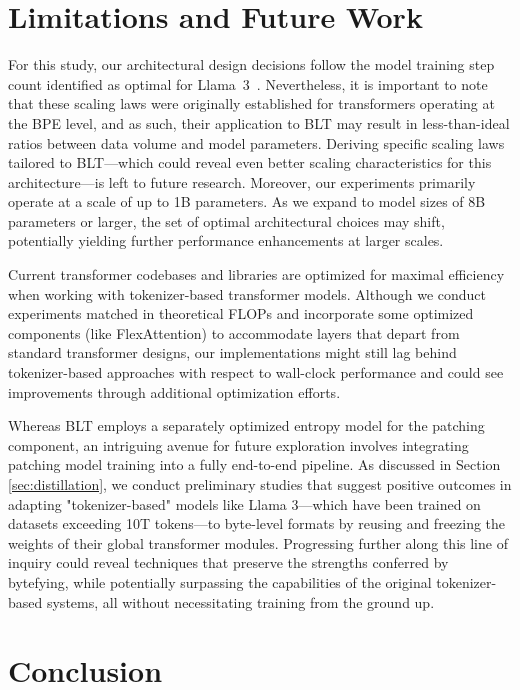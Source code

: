 \section{Limitations and Future Work}

For this study, our architectural design decisions follow the model training step count identified as optimal for Llama~3~\citep{dubey2024llama}. Nevertheless, it is important to note that these scaling laws were originally established for transformers operating at the BPE level, and as such, their application to {\textsc BLT} may result in less-than-ideal ratios between data volume and model parameters. Deriving specific scaling laws tailored to {\textsc BLT}—which could reveal even better scaling characteristics for this architecture—is left to future research. Moreover, our experiments primarily operate at a scale of up to 1B parameters. As we expand to model sizes of 8B parameters or larger, the set of optimal architectural choices may shift, potentially yielding further performance enhancements at larger scales.

Current transformer codebases and libraries are optimized for maximal efficiency when working with tokenizer-based transformer models. Although we conduct experiments matched in theoretical FLOPs and incorporate some optimized components (like FlexAttention) to accommodate layers that depart from standard transformer designs, our implementations might still lag behind tokenizer-based approaches with respect to wall-clock performance and could see improvements through additional optimization efforts.

Whereas {\textsc BLT} employs a separately optimized entropy model for the patching component, an intriguing avenue for future exploration involves integrating patching model training into a fully end-to-end pipeline. As discussed in Section \ref{sec:distillation}, we conduct preliminary studies that suggest positive outcomes in adapting "tokenizer-based" models like Llama 3—which have been trained on datasets exceeding 10T tokens—to byte-level formats by reusing and freezing the weights of their global transformer modules. Progressing further along this line of inquiry could reveal techniques that preserve the strengths conferred by bytefying, while potentially surpassing the capabilities of the original tokenizer-based systems, all without necessitating training from the ground up.

\section{Conclusion}
\label{section:conclusion}


